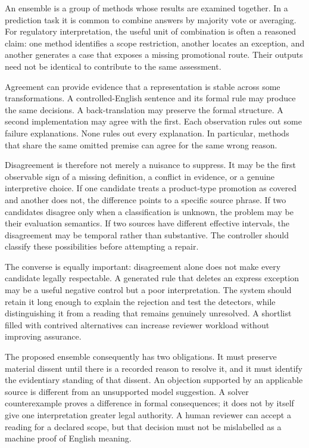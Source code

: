 \label{sec:problem-agreement}
An ensemble is a group of methods whose results are examined together. In a
prediction task it is common to combine answers by majority vote or averaging.
For regulatory interpretation, the useful unit of combination is often a
reasoned claim: one method identifies a scope restriction, another locates an
exception, and another generates a case that exposes a missing promotional route.
Their outputs need not be identical to contribute to the same assessment.

Agreement can provide evidence that a representation is stable across some
transformations. A controlled-English sentence and its formal rule may produce
the same decisions. A back-translation may preserve the formal structure. A
second implementation may agree with the first. Each observation rules out some
failure explanations. None rules out every explanation. In particular, methods
that share the same omitted premise can agree for the same wrong reason.

Disagreement is therefore not merely a nuisance to suppress. It may be the first
observable sign of a missing definition, a conflict in evidence, or a genuine
interpretive choice. If one candidate treats a product-type promotion as covered
and another does not, the difference points to a specific source phrase. If two
candidates disagree only when a classification is unknown, the problem may be
their evaluation semantics. If two sources have different effective intervals,
the disagreement may be temporal rather than substantive. The controller should
classify these possibilities before attempting a repair.

The converse is equally important: disagreement alone does not make every
candidate legally respectable. A generated rule that deletes an express exception
may be a useful negative control but a poor interpretation. The system should
retain it long enough to explain the rejection and test the detectors, while
distinguishing it from a reading that remains genuinely unresolved. A shortlist
filled with contrived alternatives can increase reviewer workload without
improving assurance.

The proposed ensemble consequently has two obligations. It must preserve
material dissent until there is a recorded reason to resolve it, and it must
identify the evidentiary standing of that dissent. An objection supported by an
applicable source is different from an unsupported model suggestion. A solver
counterexample proves a difference in formal consequences; it does not by itself
give one interpretation greater legal authority. A human reviewer can accept a
reading for a declared scope, but that decision must not be mislabelled as a
machine proof of English meaning.

